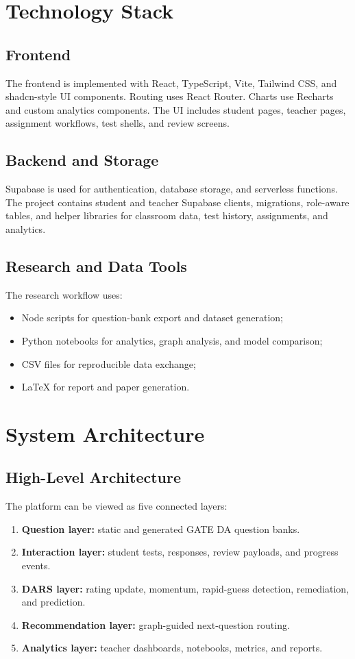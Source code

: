 \documentclass[12pt,a4paper]{report}
\begin{document}
\chapter{Technology Stack}
\section{Frontend}
The frontend is implemented with React, TypeScript, Vite, Tailwind CSS, and shadcn-style UI components. Routing uses React Router. Charts use Recharts and custom analytics components. The UI includes student pages, teacher pages, assignment workflows, test shells, and review screens.

\section{Backend and Storage}
Supabase is used for authentication, database storage, and serverless functions. The project contains student and teacher Supabase clients, migrations, role-aware tables, and helper libraries for classroom data, test history, assignments, and analytics.

\section{Research and Data Tools}
The research workflow uses:

\begin{itemize}[leftmargin=*]
  \item Node scripts for question-bank export and dataset generation;
  \item Python notebooks for analytics, graph analysis, and model comparison;
  \item CSV files for reproducible data exchange;
  \item LaTeX for report and paper generation.
\end{itemize}

\chapter{System Architecture}
\section{High-Level Architecture}
The platform can be viewed as five connected layers:

\begin{enumerate}[leftmargin=*]
  \item \textbf{Question layer:} static and generated GATE DA question banks.
  \item \textbf{Interaction layer:} student tests, responses, review payloads, and progress events.
  \item \textbf{DARS layer:} rating update, momentum, rapid-guess detection, remediation, and prediction.
  \item \textbf{Recommendation layer:} graph-guided next-question routing.
  \item \textbf{Analytics layer:} teacher dashboards, notebooks, metrics, and reports.
\end{enumerate}
\end{document}
